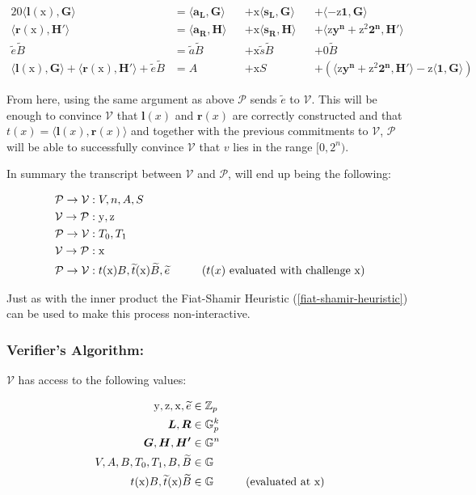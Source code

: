 \documentclass{article}
\newcommand{\eq}[1]{\begin{alignat*}{20}#1\end{alignat*}}
\newcommand{\eqn}[2]{\begin{equation}\label{#1}\begin{split}#2\end{split}\end{equation}}
\renewcommand{\vec}[1]{\boldsymbol{#1}}
\newcommand{\ran}[1]{\mathrm{#1}}
\newcommand{\vecran}[1]{\mathbf{#1}}
\newcommand{\V}{\mathcal{V}}
\renewcommand{\P}{\mathcal{P}}
\newcommand{\G}{\mathbb{G}}
\newcommand{\Z}{\mathbb{Z}}
\newcommand{\tB}{\widetilde{B}}
\renewcommand{\tt}{\widetilde{t}}
\newcommand{\dotp}[2]{\langle #1, #2 \rangle}
\newcommand{\opn}[1]{\operatorname{#1}}
\newcommand{\vecl}[1]{\vec{#1_{\opn{L}}}}
\newcommand{\vecr}[1]{\vec{#1_{\opn{R}}}}
\begin{document}
\eq{
	\dotp{\vec{l}(\ran{x})}{\vec{G}} &= \dotp{\vecl{a}}{\vec{G}} &&+ \ran{x}\dotp{\vecl{s}}{\vec{G}} &&+ \dotp{-\ran{z}\vec{1}}{\vec{G}} \\
	\dotp{\vec{r}(\ran{x})}{\vec{H'}} &= \dotp{\vecr{a}}{\vec{H}} &&+ \ran{x}\dotp{\vecr{s}}{\vec{H}} &&+ \dotp{\ran{z}\vecran{y^n} + \ran{z^2}\vec{2^n}}{\vec{H'}}\\
	\widetilde{e}\tB &= \widetilde{a}\tB &&+ \ran{x}\widetilde{s}\tB &&+ 0 \tB \\
	\dotp{\vec{l}(\ran{x})}{\vec{G}} + \dotp{\vec{r}(\ran{x})}{\vec{H'}} + \widetilde{e}\tB &= A &&+ \ran{x}S &&+ (\dotp{\ran{z}\vecran{y^n} + \ran{z^2}\vec{2^n}}{\vec{H'}} - \ran{z}\dotp{\vec{1}}{\vec{G}})
}

From here, using the same argument as above $\P$ sends $\widetilde{e}$ to $\V$. This will be enough to convince $\V$ that $\vec{l}(x)$ and $\vec{r}(x)$ are correctly constructed and that $t(x) = \dotp{\vec{l}(x)}{\vec{r}(x)}$ and together with the previous commitments to $\V$, $\P$ will be able to successfully convince $\V$ that $v$ lies in the range $[0, 2^n)$.

In summary the transcript between $\V$ and $\P$, will end up being the following:

\eq{
	\P \rightarrow \V &: V, n, A, S \\
	\V \rightarrow \P &: \ran{y}, \ran{z} \\
	\P \rightarrow \V &: T_0, T_1 \\
	\V \rightarrow \P &: \ran{x} \\
	\P \rightarrow \V &: t(\ran{x})B, \tt(\ran{x})\tB, \widetilde{e} \hspace*{1cm}\text{($t(x)$ evaluated with challenge $\ran{x}$)}\\
}

Just as with the inner product the Fiat-Shamir Heuristic (\ref{fiat-shamir-heuristic}) can be used to make this process non-interactive.

\subsubsection{Verifier's Algorithm:} \label{verifier-range-proof}

$\V$ has access to the following values:

\eqn{def1-ver}{
	\ran{y}, \ran{z}, \ran{x}, \widetilde{e} &\in \Z_p \\
	\vec{L}, \vec{R} &\in \G_p^{k} \\
	\vec{G}, \vec{H}, \vec{H'} &\in \G^n \\
	V, A, B, T_0, T_1, B, \tB &\in \G \\
	t(\ran{x})B, \tt(\ran{x})\tB &\in \G \hspace*{1cm} \text{(evaluated at x)}
}
\end{document}
